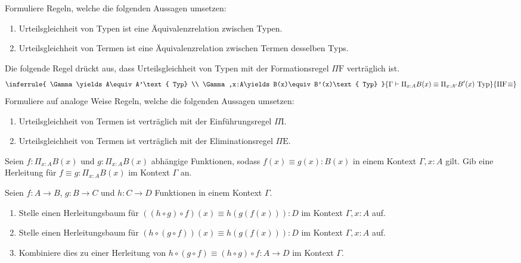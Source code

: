 \documentclass{uebung}
\begin{document}

\begin{exercise}
  Formuliere Regeln, welche die folgenden Aussagen umsetzen:
  \begin{enumerate}
    \item Urteilsgleichheit von Typen ist eine Äquivalenzrelation zwischen Typen.
    \item Urteilsgleichheit von Termen ist eine Äquivalenzrelation zwischen Termen desselben Typs.
  \end{enumerate}
  Die folgende Regel drückt aus, dass Urteilsgleichheit von Typen mit der Formationsregel $\Pi\mathrm{F}$ verträglich ist.
  $$
  \inferrule{
    \Gamma\yields A\equiv A'\text{ Typ} \\ \Gamma,x:A\yields B(x)\equiv B'(x)\text{ Typ}
  }{
    \Gamma\yields \Pi_{x:A}B(x)\equiv\Pi_{x:A'}B'(x)\text{ Typ}
  }{
    \PiForm\!\equiv
  }
  $$
  Formuliere auf analoge Weise Regeln, welche die folgenden Aussagen umsetzen:
  \begin{enumerate}[start=3]
    \item Urteilsgleichheit von Termen ist verträglich mit der Einführungsregel $\Pi\mathrm{I}$.
    \item Urteilsgleichheit von Termen ist verträglich mit der Eliminationsregel $\Pi\mathrm{E}$.
  \end{enumerate}
\end{exercise}

\begin{exercise}
  Seien $f:\Pi_{x:A}B(x)$ und $g:\Pi_{x:A}B(x)$ abhängige Funktionen, sodass $f(x)\equiv g(x):B(x)$ in einem Kontext $\Gamma,x:A$ gilt.
  Gib eine Herleitung für $f\equiv g:\Pi_{x:A}B(x)$ im Kontext $\Gamma$ an.
\end{exercise}

\begin{exercise}
  Seien $f:A\to B$, $g:B\to C$ und $h:C\to D$ Funktionen in einem Kontext $\Gamma$.
  \begin{enumerate}
    \item Stelle einen Herleitungsbaum für $((h\circ g)\circ f)(x)\equiv h(g(f(x))):D$ im Kontext $\Gamma,x:A$ auf.
    \item Stelle einen Herleitungsbaum für $(h\circ (g\circ f))(x)\equiv h(g(f(x))):D$ im Kontext $\Gamma,x:A$ auf.
    \item Kombiniere dies zu einer Herleitung von $h\circ(g\circ f)\equiv (h\circ g)\circ f:A\to D$ im Kontext $\Gamma$.
  \end{enumerate}
\end{exercise}
\end{document}
